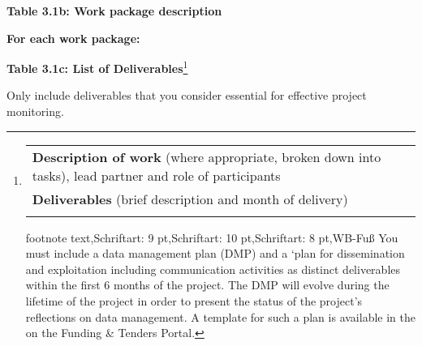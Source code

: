 \textbf{Table 3.1b: Work package description }

\textbf{For each work package: }

\textbf{Table 3.1c: List of Deliverables}\footnote{\begin{longtable}[]{@{}l@{}}
  \toprule
  \endhead
  \textbf{Description of work} (where appropriate, broken down into
  tasks), lead partner and role of participants \\
  \textbf{Deliverables} (brief description and month of delivery) \\
   \\
  \bottomrule
  \end{longtable}

  footnote text,Schriftart: 9 pt,Schriftart: 10 pt,Schriftart: 8
  pt,WB-Fuß You must include a data management plan (DMP) and a `plan
  for dissemination and exploitation including communication activities
  as distinct deliverables within the first 6 months of the project. The
  DMP will evolve during the lifetime of the project in order to present
  the status of the project's reflections on data management. A template
  for such a plan is available in the on the Funding \& Tenders Portal.}\textbf{
}

Only include deliverables that you consider essential for effective
project monitoring.

